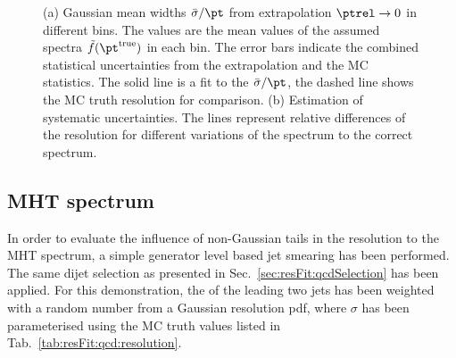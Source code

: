 \documentclass[a4paper]{cmspaper} %
\newcommand{\truth}{\ensuremath{\pt^{\text{true}}}\xspace}
\begin{document}
\begin{figure}[ht]
  \begin{center}
     
  \end{center}
  \caption{(a) Gaussian mean widths $\bar{\sigma}/\pt$ from extrapolation \mbox{$\ptrel\rightarrow0$} in different \pt bins.
  The \pt values are the mean values of the assumed spectra $\tilde{f}(\truth)$ in each bin.
  The error bars indicate the combined statistical uncertainties from the extrapolation and the MC statistics.
  The solid line is a fit to the $\bar{\sigma}/\pt$, the dashed line shows the MC truth resolution for comparison.
  (b) Estimation of systematic uncertainties.
  The lines represent relative differences of the resolution for different variations of the spectrum to the correct spectrum.}
\end{figure}
\clearpage

\subsection{MHT spectrum}
In order to evaluate the influence of non-Gaussian tails in the resolution to the MHT spectrum, a simple generator level based jet smearing has been performed.
The same dijet selection as presented in Sec.~\ref{sec:resFit:qcdSelection} has been applied.
For this demonstration, the \ptgen of the leading two jets has been weighted with a random number from a Gaussian resolution pdf, where $\sigma$ has been parameterised using the MC truth values listed in Tab.~\ref{tab:resFit:qcd:resolution}.
\end{document}
